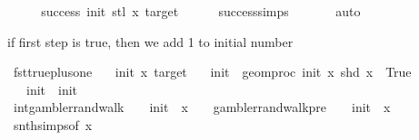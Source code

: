 \begin{isabellebody}
\isanewline
\ \ \isamarkupfalse%
\ \isamarkupfalse%
\ {\isachardoublequoteopen}success\ init{\isacharprime}{\kern0pt}\ {\isacharparenleft}{\kern0pt}stl\ x{\isacharparenright}{\kern0pt}\ target{\isachardoublequoteclose}\isanewline
\ \ \ \ \isamarkupfalse%
\ success{\isachardot}{\kern0pt}simps\ \isanewline
\ \ \ \ \isamarkupfalse%
\ auto\isanewline
{}\isamarkupfalse%
%
\endisatagproof
{\isafoldproof}%
%
\isadelimproof
%
\endisadelimproof
%
\isadelimdocument
%
\endisadelimdocument
%
\isatagdocument
%
\isamarkuptrue%
%
\endisatagdocument
{\isafolddocument}%
%
\isadelimdocument
%
\endisadelimdocument
%
\begin{isamarkuptext}%
if first step is true, then we add 1 to initial number%
\end{isamarkuptext}\isamarkuptrue%
\isamarkupfalse%
\ fst{\isacharunderscore}{\kern0pt}true{\isacharunderscore}{\kern0pt}plus{\isacharunderscore}{\kern0pt}one{\isacharcolon}{\kern0pt}\isanewline
\ \ \ init\ x\ target\isanewline
\ \ \ {\isachardoublequoteopen}init{\isacharprime}{\kern0pt}\ {\isacharequal}{\kern0pt}\ geom{\isacharunderscore}{\kern0pt}proc\ init\ x\ {}{\isachardoublequoteclose}{\isachardoublequoteopen}shd\ x\ {\isacharequal}{\kern0pt}\ True{\isachardoublequoteclose}\isanewline
\ \ \ {\isachardoublequoteopen}init{\isacharprime}{\kern0pt}\ {\isacharequal}{\kern0pt}\ init\ {\isacharplus}{\kern0pt}\ {}{\isachardoublequoteclose}\isanewline
%
\isadelimproof
%
\endisadelimproof
%
\isatagproof
{}\isamarkupfalse%
{\isacharminus}{\kern0pt}\isanewline
\ \ \isamarkupfalse%
\ int{}{\isacharcolon}{\kern0pt}{\isachardoublequoteopen}gambler{\isacharunderscore}{\kern0pt}rand{\isacharunderscore}{\kern0pt}walk\ {}\ {\isacharparenleft}{\kern0pt}{\isacharminus}{\kern0pt}\ {}{\isacharparenright}{\kern0pt}\ init\ {}\ x\ {\isacharequal}{\kern0pt}\ {}\ {\isacharplus}{\kern0pt}\ gambler{\isacharunderscore}{\kern0pt}rand{\isacharunderscore}{\kern0pt}walk{\isacharunderscore}{\kern0pt}pre\ {}\ {\isacharparenleft}{\kern0pt}{\isacharminus}{\kern0pt}\ {}{\isacharparenright}{\kern0pt}\ init\ {}\ x{\isachardoublequoteclose}\isanewline
\ \ \ \ \isamarkupfalse%
\ snth{\isachardot}{\kern0pt}simps{\isacharparenleft}{\kern0pt}{}{\isacharparenright}{\kern0pt}{\isacharbrackleft}{\kern0pt}of\ x{\isacharbrackright}{\kern0pt}\isanewline

\end{isabellebody}
